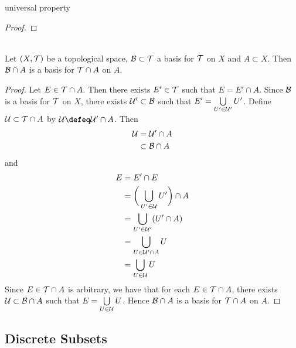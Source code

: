 \documentclass{book}
\begin{document}
\begin{ex}
	universal property
\end{ex}

\begin{proof}
\end{proof}


\begin{ex}  \\
	Let $(X, \mathcal{T})$ be a topological space, $\mathcal{B} \subset \mathcal{T}$ a basis for $\mathcal{T}$ on $X$ and $A \subset X$. Then $\mathcal{B} \cap A$ is a basis for $\mathcal{T} \cap A$ on $A$. 
\end{ex}

\begin{proof}
	Let $E \in \mathcal{T} \cap A$. Then there exists $E' \in \mathcal{T}$ such that $E = E' \cap A$. Since $\mathcal{B}$ is a basis for $\mathcal{T}$ on $X$, there exists $\mathcal{U}' \subset \mathcal{B}$ such that $E' = \bigcup\limits_{U' \in \mathcal{U}'} U'$. Define $\mathcal{U} \subset \mathcal{T} \cap A$ by $\MU \defeq \MU' \cap A$. Then 
	\begin{align*}
		\mathcal{U}
		& = \mathcal{U}' \cap A \\
		& \subset \mathcal{B} \cap A
	\end{align*}
	and
	\begin{align*}
		E
		& = E' \cap E \\
		& = \bigg( \bigcup\limits_{U' \in \mathcal{U}} U' \bigg)  \cap A \\
		& = \bigcup\limits_{U' \in \mathcal{U}'} (U' \cap A) \\
		& = \bigcup\limits_{U \in \mathcal{U}' \cap A} U \\
		& = \bigcup\limits_{U \in \mathcal{U}} U 
	\end{align*}
	Since $E \in \mathcal{T} \cap A$ is arbitrary, we have that for each $E \in \mathcal{T} \cap A$, there exists $\mathcal{U} \subset \mathcal{B} \cap A$ such that $E = \bigcup\limits_{U \in \mathcal{U}} U $. Hence $\mathcal{B} \cap A$ is a basis for $\mathcal{T} \cap A$ on $A$.
\end{proof}
























\subsection{Discrete Subsets}
\end{document}
